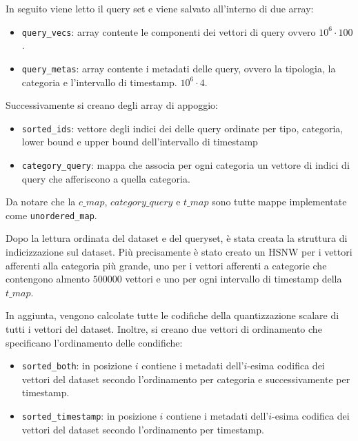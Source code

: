 In seguito viene letto il query set e viene salvato all'interno di due array:
\begin{itemize}
    \item \texttt{query\_vecs}: array contente le componenti dei vettori di query ovvero 
    $10^6 \cdot 100$.
    \item \texttt{query\_metas}: array contente i metadati delle query, ovvero la tipologia,
    la categoria e l'intervallo di timestamp.
    $10^6 \cdot 4$.
\end{itemize}

Successivamente si creano degli array di appoggio:
\begin{itemize}
    \item \texttt{sorted\_ids}: vettore degli indici dei delle query ordinate per tipo, 
    categoria, lower bound e upper bound dell'intervallo di timestamp
    \item \texttt{category\_query}: mappa che associa per ogni categoria un vettore di 
    indici di query che afferiscono a quella categoria.
\end{itemize}

Da notare che la $c\_map$, $category\_query$ e $t\_map$ sono tutte mappe implementate 
come \texttt{unordered\_map}.

Dopo la lettura ordinata del dataset e del queryset, è stata creata la struttura 
di indicizzazione sul dataset. Più precisamente è stato creato un HSNW per i vettori 
afferenti alla categoria più grande, uno per i vettori afferenti a categorie che 
contengono almento $500000$ vettori e uno per ogni intervallo di timestamp della 
$t\_map$. 

In aggiunta, vengono calcolate tutte le codifiche della quantizzazione scalare 
di tutti i vettori del dataset. Inoltre, si creano due vettori di ordinamento 
che specificano l'ordinamento delle condifiche:
\begin{itemize}
    \item \texttt{sorted\_both}: in posizione $i$ contiene i metadati dell'$i$-esima
    codifica dei vettori del dataset secondo l'ordinamento per categoria e successivamente
    per timestamp.
    \item \texttt{sorted\_timestamp}: in posizione $i$ contiene i metadati dell'$i$-esima
    codifica dei vettori del dataset secondo l'ordinamento per timestamp.
\end{itemize}

